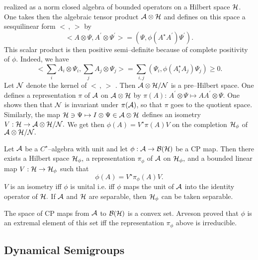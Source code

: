 \documentclass[12pt]{article}
\def\be{\begin{equation}} \def\ee{\end{equation}}
\begin{document}
realized as a norm closed algebra of bounded operators on a Hilbert space 
${\cal H}$.  One takes then the algebraic tensor product ${\cal A}\otimes 
{\cal H}$ and defines on this space a sesquilinear form $ <\,  , \,  >$ by 
\be <A\otimes \Psi ,  A^{\prime}\otimes
\Psi^{\prime}>= (\Psi ,  \phi  (A^{\star}A^{\prime} ) \Psi^{\prime}) .  \ee
This scalar product is then positive semi--definite because of complete
positivity of $\phi . $ Indeed,  we have \be <\sum_i A_i\otimes\Psi_i ,  \sum_j
A_j\otimes\Psi_j > = \sum_{i, j}  (\Psi_i, \phi  (A_i^{\star } A_j ) \Psi_j )
\geq 0 .  \ee  Let ${\cal N}$ denote the kernel of $ <\,  , \,  >$ .  
Then ${\cal A}\otimes {\cal H} / {\cal N} $ is a
pre--Hilbert space.  One defines a representation $\pi$ of ${\cal A}$ on 
${\cal A}\otimes {\cal H}$ by $\pi  (A) : \,  A^{\prime}\otimes\Psi\longmapsto
AA^{\prime}\otimes\Psi . $ One shows then that ${\cal N}$ is invariant under $
\pi  ({\cal A})$,  so that $\pi $ goes to the quotient space.  Similarly,  the
map ${\cal H}\ni\Psi \mapsto I\otimes \Psi \in {\cal A}\otimes{\cal H}$ 
defines an isometry $V :  {\cal H}
\rightarrow {\cal A}\otimes {\cal H} / {\cal N} . $ We get then $
\phi  (A) = V^{\star}\pi  (A) V $ on the completion ${\cal H}_{\phi } $ of $
{\cal A}\otimes {\cal H} / {\cal N} . $ \vspace{0.5cm}\\
\begin{theorem}
Let ${\cal A}$ be a
$C^{\star}$--algebra with unit and let $\phi : {\cal A}\rightarrow
{\cal B} ({\cal H})$ be a CP map.  Then there exists a
Hilbert space ${\cal H}_\phi , $ a representation $\pi_\phi$ of ${\cal A}$
on ${\cal H}_\phi ,  $ and a bounded linear map $V :  {\cal
H}\rightarrow {\cal H}_\phi $ such that  
\be \phi  (A) = V^{\star}\pi_\phi
 (A) V .  
\ee $V$ is an isometry iff $\phi$ is unital i.e.  iff $\phi$
maps the unit of ${\cal A}$ into the identity operator of ${\cal H}. $
If ${\cal A}$ and ${\cal H}$ are separable,  then ${\cal H}_\phi $ can
be taken separable. 
\end{theorem}
\vspace{1cm}
The space of CP maps from ${\cal A}$ to ${\cal B} ({\cal H})$
is a convex set.  Arveson \cite{arv} proved that $\phi $ is an extremal
element of this set iff the representation $\pi_\phi$ above is irreducible. 

\subsection{Dynamical Semigroups}
\end{document}

